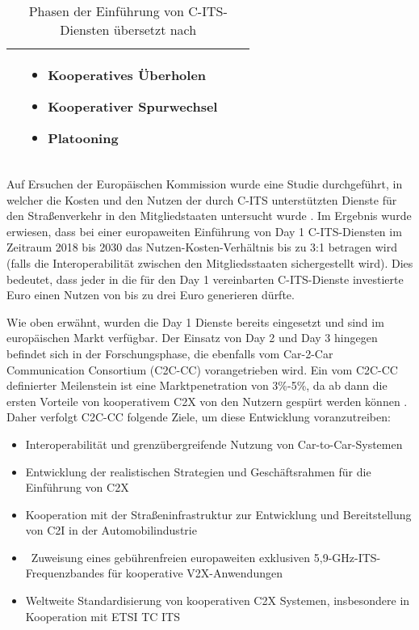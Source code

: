 \begin{table}[h!]
\begin{tabular}{|m{4em}|m{10em}|m{10em}|m{8em}|}
\begin{itemize}[leftmargin=0.3cm]
	\end{itemize} & 
	\begin{itemize}[leftmargin=0.3cm] \item Kooperatives Überholen
	
	\item Kooperativer Spurwechsel
	
	\item Platooning
	
	\end{itemize} \\ 
		\hline
	\end{tabular}
	\caption{Phasen der Einführung von C-ITS-Diensten übersetzt nach \cite{Car2Car}}
	\label{table:1}
\end{table}

Auf Ersuchen der Europäischen Kommission wurde eine Studie durchgeführt, in welcher die Kosten und den Nutzen der durch C-ITS unterstützten Dienste für den Straßenverkehr in den Mitgliedstaaten untersucht wurde \cite{StudyDeployment}. Im Ergebnis wurde erwiesen, dass bei einer europaweiten Einführung von Day 1 C-ITS-Diensten im Zeitraum 2018 bis 2030 das Nutzen-Kosten-Verhältnis bis zu 3:1 betragen wird (falls die Interoperabilität zwischen den Mitgliedsstaaten sichergestellt wird). Dies bedeutet, dass jeder in die für den Day 1 vereinbarten C-ITS-Dienste investierte Euro einen Nutzen von bis zu drei Euro generieren dürfte. 

Wie oben erwähnt, wurden die Day 1 Dienste bereits eingesetzt und sind im europäischen Markt verfügbar. Der Einsatz von Day 2 und Day 3 hingegen befindet sich in der Forschungsphase, die ebenfalls vom Car-2-Car Communication Consortium (C2C-CC) vorangetrieben wird. Ein vom C2C-CC definierter Meilenstein ist eine Marktpenetration von 3\%-5\%, da ab dann die ersten Vorteile von kooperativem C2X von den Nutzern gespürt werden können \cite{Car2Car}. Daher verfolgt C2C-CC folgende Ziele, um diese Entwicklung voranzutreiben:

\begin{itemize}
	\item Interoperabilität und grenzübergreifende Nutzung von Car-to-Car-Systemen
	\item Entwicklung der realistischen Strategien und Geschäftsrahmen für die Einführung von C2X
	\item Kooperation mit der Straßeninfrastruktur zur Entwicklung und Bereitstellung von C2I in der Automobilindustrie
	\item  Zuweisung eines gebührenfreien europaweiten exklusiven 5,9-GHz-ITS-Frequenzbandes für kooperative V2X-Anwendungen
	\item Weltweite Standardisierung von kooperativen C2X Systemen, insbesondere in Kooperation mit ETSI TC ITS
\end{itemize}

